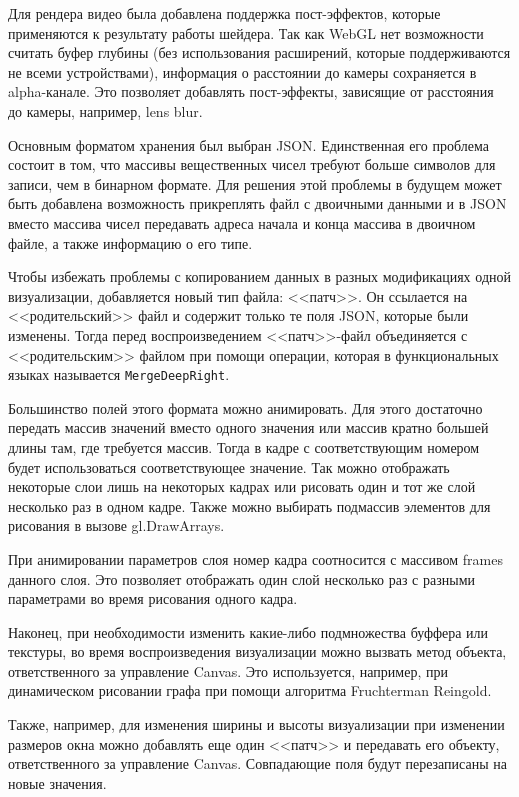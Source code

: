 Для рендера видео была добавлена поддержка пост-эффектов, которые применяются к результату работы шейдера. Так как WebGL нет возможности считать буфер глубины (без использования расширений, которые поддерживаются не всеми устройствами), информация о расстоянии до камеры сохраняется в alpha-канале. Это позволяет добавлять пост-эффекты, зависящие от расстояния до камеры, например, lens blur.

Основным форматом хранения был выбран JSON. Единственная его проблема состоит в том, что массивы вещественных чисел требуют больше символов для записи, чем в бинарном формате. Для решения этой проблемы в будущем может быть добавлена возможность прикреплять файл с двоичными данными и в JSON вместо массива чисел передавать адреса начала и конца массива в двоичном файле, а также информацию о его типе.

Чтобы избежать проблемы с копированием данных в разных модификациях одной визуализации, добавляется новый тип файла: <<патч>>. Он ссылается на <<родительский>> файл и содержит только те поля JSON, которые были изменены. Тогда перед воспроизведением <<патч>>-файл объединяется с <<родительским>> файлом при помощи операции, которая в функциональных языках называется \texttt{MergeDeepRight}.

Большинство полей этого формата можно анимировать. Для этого достаточно передать массив значений вместо одного значения или массив кратно большей длины там, где требуется массив. Тогда в кадре с соответствующим номером будет использоваться соответствующее значение. Так можно отображать некоторые слои лишь на некоторых кадрах или рисовать один и тот же слой несколько раз в одном кадре. Также можно выбирать подмассив элементов для рисования в вызове gl.DrawArrays.

При анимировании параметров слоя номер кадра соотносится с массивом frames данного слоя. Это позволяет отображать один слой несколько раз с разными параметрами во время рисования одного кадра.

Наконец, при необходимости изменить какие-либо подмножества буффера или текстуры, во время воспроизведения визуализации можно вызвать метод объекта, ответственного за управление Canvas. Это используется, например, при динамическом рисовании графа при помощи алгоритма Fruchterman Reingold.

Также, например, для изменения ширины и высоты визуализации при изменении размеров окна можно добавлять еще один <<патч>> и передавать его объекту, ответственного за управление Canvas. Совпадающие поля будут перезаписаны на новые значения.

